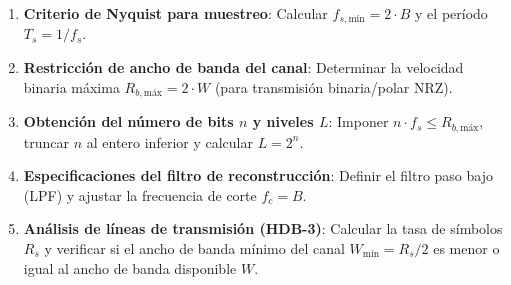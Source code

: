 \begin{mecanizado}
\begin{enumerate}
    \item \textbf{Criterio de Nyquist para muestreo}: Calcular $f_{s,\text{mín}} = 2 \cdot B$ y el período $T_s = 1/f_s$.
    \item \textbf{Restricción de ancho de banda del canal}: Determinar la velocidad binaria máxima $R_{b,\text{máx}} = 2 \cdot W$ (para transmisión binaria/polar NRZ).
    \item \textbf{Obtención del número de bits $n$ y niveles $L$}: Imponer $n \cdot f_s \le R_{b,\text{máx}}$, truncar $n$ al entero inferior y calcular $L = 2^n$.
    \item \textbf{Especificaciones del filtro de reconstrucción}: Definir el filtro paso bajo (LPF) y ajustar la frecuencia de corte $f_c = B$.
    \item \textbf{Análisis de líneas de transmisión (HDB-3)}: Calcular la tasa de símbolos $R_s$ y verificar si el ancho de banda mínimo del canal $W_{\text{mín}} = R_s / 2$ es menor o igual al ancho de banda disponible $W$.
\end{enumerate}
\end{mecanizado}

